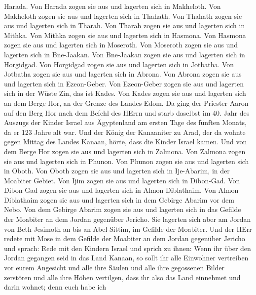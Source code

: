 Harada.  Von Harada zogen sie aus und lagerten sich in
Makheloth.  Von Makheloth zogen sie aus und lagerten sich
in Thahath.  Von Thahath zogen sie aus und lagerten sich in
Tharah.  Von Tharah zogen sie aus und lagerten sich in
Mithka.  Von Mithka zogen sie aus und lagerten sich in
Hasmona.  Von Hasmona zogen sie aus und lagerten sich in
Moseroth.  Von Moseroth zogen sie aus und lagerten sich in
Bne-Jaakan.  Von Bne-Jaakan zogen sie aus und lagerten sich
in Horgidgad.  Von Horgidgad zogen sie aus und lagerten
sich in Jotbatha.  Von Jotbatha zogen sie aus und lagerten
sich in Abrona.  Von Abrona zogen sie aus und lagerten sich
in Ezeon-Geber.  Von Ezeon-Geber zogen sie aus und lagerten
sich in der Wüste Zin, das ist Kades.  Von Kades zogen sie
aus und lagerten sich an dem Berge Hor, an der Grenze des Landes Edom.
 Da ging der Priester Aaron auf den Berg Hor nach dem
Befehl des HErrn und starb daselbst im 40. Jahr des Auszugs der Kinder
Israel aus Ägyptenland am ersten Tage des fünften Monats, 
da er 123 Jahre alt war.  Und der König der Kanaaniter zu
Arad, der da wohnte gegen Mittag des Landes Kanaan, hörte, dass die
Kinder Israel kamen.  Und von dem Berge Hor zogen sie aus
und lagerten sich in Zalmona.  Von Zalmona zogen sie aus
und lagerten sich in Phunon.  Von Phunon zogen sie aus und
lagerten sich in Oboth.  Von Oboth zogen sie aus und
lagerten sich in Ije-Abarim, in der Moabiter Gebiet.  Von
Ijim zogen sie aus und lagerten sich in Dibon-Gad.  Von
Dibon-Gad zogen sie aus und lagerten sich in Almon-Diblathaim.
 Von Almon-Diblathaim zogen sie aus und lagerten sich in
dem Gebirge Abarim vor dem Nebo.  Von dem Gebirge Abarim
zogen sie aus und lagerten sich in das Gefilde der Moabiter an dem
Jordan gegenüber Jericho.  Sie lagerten sich aber am Jordan
von Beth-Jesimoth an bis an Abel-Sittim, im Gefilde der Moabiter.
 Und der HErr redete mit Mose in dem Gefilde der Moabiter
an dem Jordan gegenüber Jericho und sprach:  Rede mit den
Kindern Israel und sprich zu ihnen: Wenn ihr über den Jordan gegangen
seid in das Land Kanaan,  so sollt ihr alle Einwohner
vertreiben vor eurem Angesicht und alle ihre Säulen und alle ihre
gegossenen Bilder zerstören und alle ihre Höhen vertilgen, 
dass ihr also das Land einnehmet und darin wohnet; denn euch habe ich
